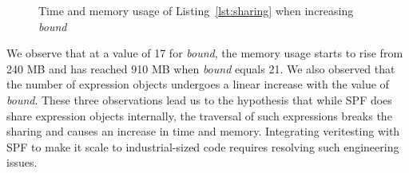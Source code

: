 \begin{figure}%
    \centering
    \qquad
    \caption{Time and memory usage of Listing~\ref{lst:sharing} when increasing \textit{bound}}%
    \label{fig:sharing}%
    \vspace{-0.2in}
\end{figure}
%
We observe that at a value of 17 for \textit{bound}, the memory usage starts to rise from 240 MB and has reached 910 MB when \textit{bound} equals 21.
%
We also observed that the number of expression objects undergoes a linear increase with the value of \textit{bound}.
%
These three observations lead us to the hypothesis that while SPF does share expression objects internally, the traversal of such expressions breaks the sharing and causes an increase in time and memory.
%
%
Integrating veritesting with SPF to make it scale to industrial-sized code requires resolving such engineering issues.
%
